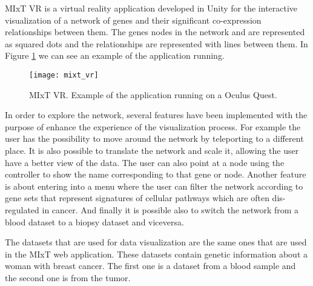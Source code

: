 %
%

MIxT VR is a virtual reality application developed in Unity for the interactive visualization of a network of genes and their significant co-expression relationships between them. The genes nodes in the network and are represented as squared dots and the relationships are represented with lines between them. In Figure \ref{fig:mixt_vr} we can see an example of the application running.

\begin{figure}[h!]
    \setlength{\tempheight}{15ex}
    \centering
    \texttt{[image: mixt\_vr]}
    \caption{MIxT VR. Example of the application running on a Oculus Quest.}
    \label{fig:mixt_vr}
\end{figure}

In order to explore the network, several features have been implemented with the purpose of enhance the experience of the visualization process. For example the user has the possibility to move around the network by teleporting to a different place. It is also possible to translate the network and scale it, allowing the user have a better view of the data. The user can also point at a node using the controller to show the name corresponding to that gene or node. Another feature is about entering into a menu where the user can filter the network according to gene sets that represent signatures of cellular pathways which are often dis-regulated in cancer. And finally it is possible also to switch the network from a blood dataset to a biopsy dataset and viceversa.

The datasets that are used for data visualization are the same ones that are used in the MIxT web application\cite{fjukstad_dumeaux_olsen_lund_hallett_bongo_2017}. These datasets contain genetic information about a woman with breast cancer. The first one is a dataset from a blood sample and the second one is from the tumor.



